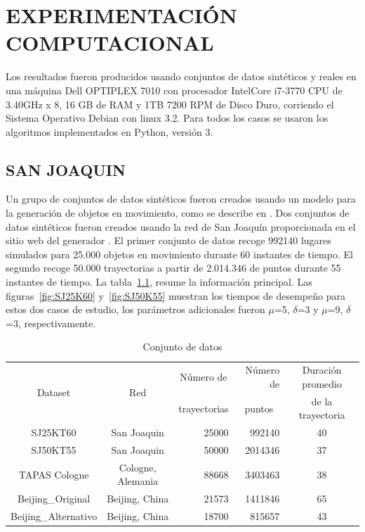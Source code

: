 \chapter{EXPERIMENTACIÓN COMPUTACIONAL}

Los resultados fueron producidos usando conjuntos de datos sintéticos y reales 
en una máquina
Dell OPTIPLEX 7010 con procesador Intel\textregistered Core\texttrademark  
i7-3770 CPU de 3.40GHz x 8,
16 GB de RAM y 1TB 7200 RPM de Disco Duro, corriendo el Sistema Operativo Debian con linux 3.2. Para 
todos los casos se usaron
los algoritmos implementados en Python, versión 3.

\section{SAN JOAQUIN}

Un grupo de conjuntos de datos sintéticos fueron creados usando un modelo para 
la generación de objetos en movimiento, como se describe en 
\cite{brinkhoff2002framework}.
Dos conjuntos de datos sintéticos fueron creados usando la red de San Joaquín 
proporcionada en el sitio web del generador \cite{Brin:2010:Online}.
El primer conjunto de datos recoge 992140 lugares simulados para 25.000 objetos 
en movimiento durante 60 instantes de tiempo. El segundo recoge 50.000 
trayectorias a partir de 2.014.346 de puntos durante 55 instantes de tiempo. La 
tabla~\ref{tab:datasets}, resume la información principal. Las 
figuras~\ref{fig:SJ25K60} y~\ref{fig:SJ50K55} muestran los tiempos de desempeño 
para estos dos casos de estudio, los parámetros adicionales fueron $\mu$=5, 
$\delta$=3 y  $\mu$=9, $\delta$=3, respectivamente.


\begin{table}
\caption{Conjunto de datos}
\label{tab:datasets}
\centering
\begin{tabular}{c c r r c}
\toprule
\multirow{2}{*}{Dataset}& \multirow{2}{*}{Red}& \multicolumn{1}{c}{Número de}& 
Número de  & Duración promedio\\
                        &                         & trayectorias & 
\multicolumn{1}{c}{puntos} & de la trayectoria\\
\midrule
SJ25KT60  & San Joaquin & 25000 & 992140  & 40\\
SJ50KT55  & San Joaquin & 50000 & 2014346 & 37\\
TAPAS Cologne  & Cologne, Alemania & 88668 & 3403463 & 38\\
Beijing\_Original   & Beijing, China   & 21573 & 1411846& 65\\
Beijing\_Alternativo   & Beijing, China   & 18700 & 815657 & 43\\
\bottomrule
\end{tabular}\par
\bigskip
\end{table}

